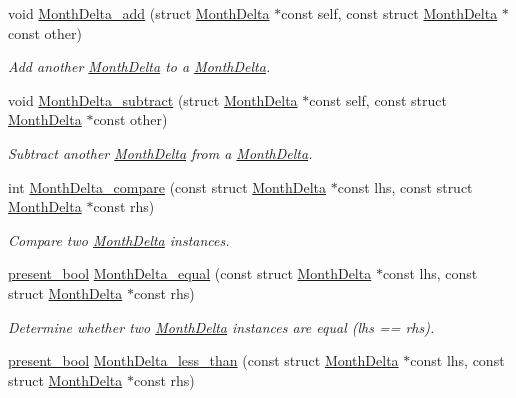\begin{DoxyCompactItemize}
void \hyperlink{month-delta_8h_abfad34a14bf54d199a2f87eaef326cd7}{Month\-Delta\-\_\-add} (struct \hyperlink{structMonthDelta}{Month\-Delta} $\ast$const self, const struct \hyperlink{structMonthDelta}{Month\-Delta} $\ast$const other)
\begin{DoxyCompactList}\small\item\em Add another \hyperlink{structMonthDelta}{Month\-Delta} to a \hyperlink{structMonthDelta}{Month\-Delta}. \end{DoxyCompactList}\item 
void \hyperlink{month-delta_8h_a1f28431851a8b020b8a325cfbfbfdb44}{Month\-Delta\-\_\-subtract} (struct \hyperlink{structMonthDelta}{Month\-Delta} $\ast$const self, const struct \hyperlink{structMonthDelta}{Month\-Delta} $\ast$const other)
\begin{DoxyCompactList}\small\item\em Subtract another \hyperlink{structMonthDelta}{Month\-Delta} from a \hyperlink{structMonthDelta}{Month\-Delta}. \end{DoxyCompactList}\item 
int \hyperlink{month-delta_8h_a1428161f8576c24beb2208127abd890e}{Month\-Delta\-\_\-compare} (const struct \hyperlink{structMonthDelta}{Month\-Delta} $\ast$const lhs, const struct \hyperlink{structMonthDelta}{Month\-Delta} $\ast$const rhs)
\begin{DoxyCompactList}\small\item\em Compare two \hyperlink{structMonthDelta}{Month\-Delta} instances. \end{DoxyCompactList}\item 
\hyperlink{types_8h_a1c24e2cdd988b886e889080ded176ae0}{present\-\_\-bool} \hyperlink{month-delta_8h_a91491c8d411b52dee3ecd6bcf0b3f097}{Month\-Delta\-\_\-equal} (const struct \hyperlink{structMonthDelta}{Month\-Delta} $\ast$const lhs, const struct \hyperlink{structMonthDelta}{Month\-Delta} $\ast$const rhs)
\begin{DoxyCompactList}\small\item\em Determine whether two \hyperlink{structMonthDelta}{Month\-Delta} instances are equal (lhs == rhs). \end{DoxyCompactList}\item 
\hyperlink{types_8h_a1c24e2cdd988b886e889080ded176ae0}{present\-\_\-bool} \hyperlink{month-delta_8h_af10d7aa9aad3ecb5d10f2091fa4fb5c4}{Month\-Delta\-\_\-less\-\_\-than} (const struct \hyperlink{structMonthDelta}{Month\-Delta} $\ast$const lhs, const struct \hyperlink{structMonthDelta}{Month\-Delta} $\ast$const rhs)

\end{DoxyCompactItemize}
